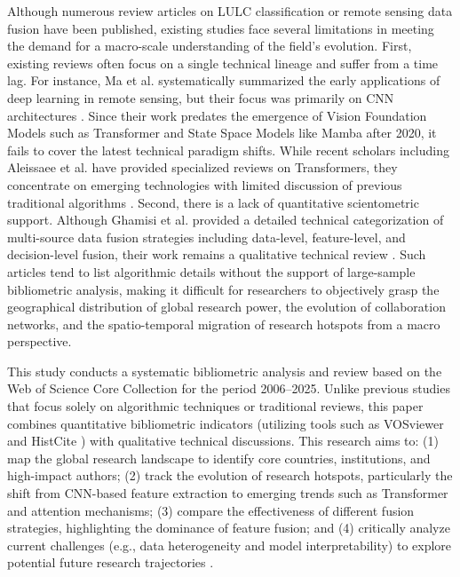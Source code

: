 \documentclass[]{interact}
\theoremstyle{plain}%
\theoremstyle{definition}
\theoremstyle{remark}
\begin{document}
Although numerous review articles on LULC classification or remote sensing data fusion have been published, existing studies face several limitations in meeting the demand for a macro-scale understanding of the field's evolution. First, existing reviews often focus on a single technical lineage and suffer from a time lag. For instance, Ma et al. systematically summarized the early applications of deep learning in remote sensing, but their focus was primarily on CNN architectures \citep{ORIGma2019deep}. Since their work predates the emergence of Vision Foundation Models such as Transformer and State Space Models like Mamba after 2020, it fails to cover the latest technical paradigm shifts. While recent scholars including Aleissaee et al. have provided specialized reviews on Transformers, they concentrate on emerging technologies with limited discussion of previous traditional algorithms \citep{7}. Second, there is a lack of quantitative scientometric support. Although Ghamisi et al. provided a detailed technical categorization of multi-source data fusion strategies including data-level, feature-level, and decision-level fusion, their work remains a qualitative technical review \citep{ORIG6,7,8}. Such articles tend to list algorithmic details without the support of large-sample bibliometric analysis, making it difficult for researchers to objectively grasp the geographical distribution of global research power, the evolution of collaboration networks, and the spatio-temporal migration of research hotspots from a macro perspective.



This study conducts a systematic bibliometric analysis and review based on the Web of Science Core Collection for the period 2006--2025. Unlike previous studies that focus solely on algorithmic techniques or traditional reviews, this paper combines quantitative bibliometric indicators (utilizing tools such as VOSviewer and HistCite \citep{9,10}) with qualitative technical discussions. This research aims to: (1) map the global research landscape to identify core countries, institutions, and high-impact authors; (2) track the evolution of research hotspots, particularly the shift from CNN-based feature extraction to emerging trends such as Transformer and attention mechanisms; (3) compare the effectiveness of different fusion strategies, highlighting the dominance of feature fusion; and (4) critically analyze current challenges (e.g., data heterogeneity and model interpretability) to explore potential future research trajectories \citep{ORIGli2024feddiff}.
\end{document}
